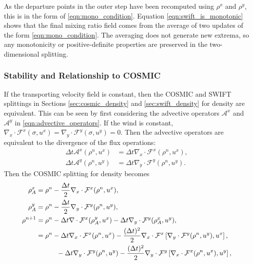 \documentclass[11pt,a4paper]{article}
\begin{document}
As the departure points in the outer step have been recomputed using $\rho^x$ and $\rho^y$, this is in the form of \eqref{eqn:mono_condition}.
Equation \eqref{eqn:swift_is_monotonic} shows that the final mixing ratio field comes from the average of two updates of the form \eqref{eqn:mono_condition}.
The averaging does not generate new extrema, so any monotonicity or positive-definite properties are preserved in the two-dimensional splitting.

\subsubsection{Stability and Relationship to COSMIC}
If the transporting velocity field is constant, then the COSMIC and SWIFT splittings in Sections \ref{sec:cosmic_density} and \ref{sec:swift_density} for density are equivalent.
This can be seen by first considering the advective operators $\mathcal{A}^x$ and $\mathcal{A}^y$ in \eqref{eqn:advective_operators}.
If the wind is constant, $\nabla_x\cdot\mathcal{F}^x(\sigma,u^x)=\nabla_y\cdot\mathcal{F}^y(\sigma,u^y)=0$.
Then the advective operators are equivalent to the divergence of the flux operations:
\begin{subequations}
\begin{align}
    \Delta{t} \mathcal{A}^x(\rho^n, u^x) & = \Delta{t} \nabla_x\cdot \mathcal{F}^x(\rho^n,u^x), \\
    \Delta{t} \mathcal{A}^y(\rho^n, u^y) & =  \Delta{t} \nabla_y\cdot \mathcal{F}^y(\rho^n,u^y).
\end{align}
\end{subequations}
Then the COSMIC splitting for density becomes
\begin{subequations} \label{eqn:cosmic_const_wind}
\begin{align}
\rho_A^x & = \rho^n - \frac{\Delta t}{2} \nabla_x \cdot \mathcal{F}^x(\rho^n, u^x), \\
\rho_A^y & = \rho^n - \frac{\Delta t}{2} \nabla_y \cdot \mathcal{F}^y(\rho^n, u^y), \\
\rho^{n+1} & = \rho^n - \Delta t \nabla \cdot \mathcal{F}^x(\rho_A^y, u^x) - \Delta t \nabla_y \cdot \mathcal{F}^y(\rho_A^x, u^y), \\
& = \rho^n - \Delta t \nabla_x\cdot\mathcal{F}^x(\rho^n,u^x) - \frac{(\Delta t)^2}{2}\nabla_x\cdot\mathcal{F}^x\left[\nabla_y\cdot\mathcal{F}^y(\rho^n,u^y),u^x\right], \\
\notag
& \qquad \quad -  \Delta t \nabla_y\cdot\mathcal{F}^y(\rho^n,u^y) - \frac{(\Delta t)^2}{2}\nabla_y\cdot\mathcal{F}^y\left[\nabla_x\cdot\mathcal{F}^x(\rho^n,u^x),u^y\right],
\end{align}
\end{subequations}
\end{document}
